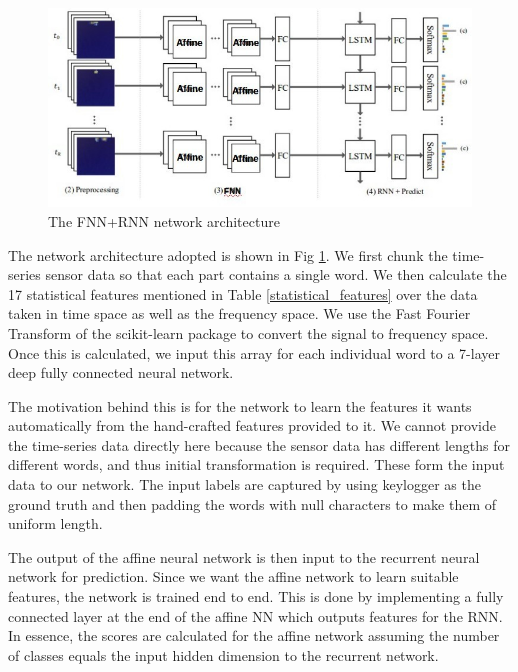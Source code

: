 \documentclass[10pt,twocolumn,letterpaper]{article}
\begin{document}
\begin{figure}[t]
\begin{center}
   \includegraphics[width=0.99\linewidth]{./network.jpg}
\end{center}
   \caption{The FNN+RNN network architecture}
\label{fig:network}
\end{figure}

The network architecture adopted is shown in Fig \ref{fig:network}. We first chunk the time-series sensor data so that each part contains a single word. We then calculate the 17 statistical features mentioned in Table \ref{statistical_features} over the data taken in time space as well as the frequency space. We use the Fast Fourier Transform of the scikit-learn package \cite{scikit-learn} to convert the signal to frequency space. Once this is calculated, we input this array for each individual word to a 7-layer deep fully connected neural network.

The motivation behind this is for the network to learn the features it wants automatically from the hand-crafted features provided to it. We cannot provide the time-series data directly here because the sensor data has different lengths for different words, and thus initial transformation is required. These form the input data to our network. The input labels are captured by using keylogger as the ground truth and then padding the words with null characters to make them of uniform length. 

The output of the affine neural network is then input to the recurrent neural network for prediction. Since we want the affine network to learn suitable features, the network is trained end to end. This is done by implementing a fully connected layer at the end of the affine NN which outputs features for the RNN. In essence, the scores are calculated for the affine network assuming the number of classes equals the input hidden dimension to the recurrent network.
\end{document}

